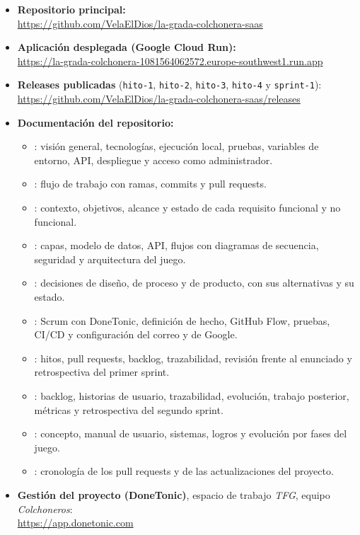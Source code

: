 \begin{sloppypar}
\setlength{\emergencystretch}{5em}
\begin{itemize}
    \item \textbf{Repositorio principal:}\\
    \url{https://github.com/VelaElDios/la-grada-colchonera-saas}
    \item \textbf{Aplicación desplegada (Google Cloud Run):}\\
    \url{https://la-grada-colchonera-1081564062572.europe-southwest1.run.app}
    \item \textbf{Releases publicadas} (\texttt{hito-1}, \texttt{hito-2}, \texttt{hito-3}, \texttt{hito-4} y \texttt{sprint-1}):\\
    \url{https://github.com/VelaElDios/la-grada-colchonera-saas/releases}
    \item \textbf{Documentación del repositorio:}
    \begin{itemize}
        \item {}: visión general, tecnologías, ejecución local, pruebas, variables de entorno, API, despliegue y acceso como administrador.
        \item {}: flujo de trabajo con ramas, commits y pull requests.
        \item {}: contexto, objetivos, alcance y estado de cada requisito funcional y no funcional.
        \item {}: capas, modelo de datos, API, flujos con diagramas de secuencia, seguridad y arquitectura del juego.
        \item {}: decisiones de diseño, de proceso y de producto, con sus alternativas y su estado.
        \item {}: Scrum con DoneTonic, definición de hecho, GitHub Flow, pruebas, CI/CD y configuración del correo y de Google.
        \item {}: hitos, pull requests, backlog, trazabilidad, revisión frente al enunciado y retrospectiva del primer sprint.
        \item {}: backlog, historias de usuario, trazabilidad, evolución, trabajo posterior, métricas y retrospectiva del segundo sprint.
        \item {}: concepto, manual de usuario, sistemas, logros y evolución por fases del juego.
        \item {}: cronología de los pull requests y de las actualizaciones del proyecto.
    \end{itemize}
    \item \textbf{Gestión del proyecto (DoneTonic)}, espacio de trabajo \textit{TFG}, equipo \textit{Colchoneros}:\\
    \url{https://app.donetonic.com}
\end{itemize}
\end{sloppypar}


